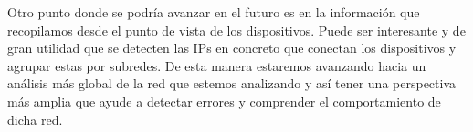 \documentclass[tfg,epsbased,lof,lot,loa,covers,final,copyright,overleaf]{tfgtfmthesisuam}
\begin{document}
Otro punto donde se podría avanzar en el futuro es en la información que recopilamos desde el punto de vista de los dispositivos. Puede ser interesante y de gran utilidad que se detecten las IPs en concreto que conectan los dispositivos y agrupar estas por subredes. De esta manera estaremos avanzando hacia un análisis más global de la red que estemos analizando y así tener una perspectiva más amplia que ayude a detectar errores y comprender el comportamiento de dicha red.

\end{document}
